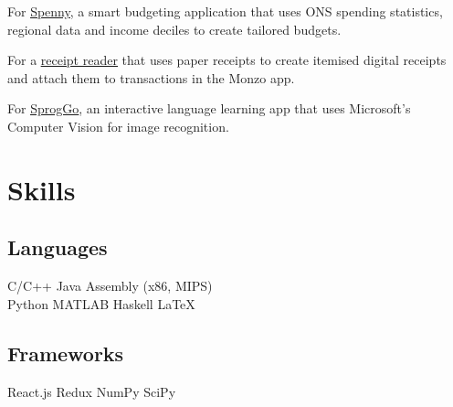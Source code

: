 \documentclass[]{deedy-resume-openfont}
\begin{document}
\begin{minipage}[t]{0.33\textwidth}
For \href{https://github.com/kimbethstonehouse/spenny}{\underline{Spenny}}, a smart budgeting application that uses ONS spending statistics, regional data and income deciles to create tailored budgets.
\sectionsep

For a \href{https://github.com/kimbethstonehouse/monzo-receipt-reader}{\underline{receipt reader}} that uses paper receipts to create itemised digital receipts and attach them to transactions in the Monzo app.
\sectionsep

For \href{https://github.com/kimbethstonehouse/SprogGo}{\underline{SprogGo}}, an interactive language learning app that uses Microsoft's Computer Vision for image recognition.
\sectionsep


\section{Skills}
\subsection{Languages}
C/C++ \textbullet{} Java \textbullet{} Assembly (x86, MIPS) \\
Python \textbullet{} MATLAB \textbullet{} Haskell \textbullet{} \LaTeX \\
\sectionsep

\subsection{Frameworks}
React.js \textbullet{} Redux \textbullet{} NumPy \textbullet{} SciPy

%
%

\end{minipage} 
\hfill
\end{document}
